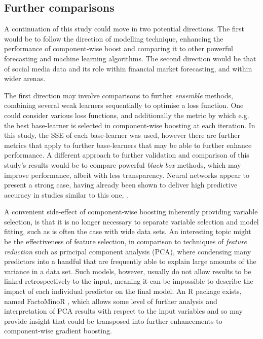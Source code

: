 \documentclass{article}
\begin{document}
\subsection{Further comparisons}
\label{sec-7-1}

A continuation of this study could move in two potential directions. The first would be to follow the direction of modelling technique, enhancing the performance of component-wise boost and comparing it to other powerful forecasting and machine learning algorithms. The second direction would be that of social media data and its role within financial market forecasting, and within wider arenas.

The first direction may involve comparisons to further \emph{ensemble} methods, combining several weak learners sequentially to optimise a loss function. One could consider various loss functions, and additionally the metric by which e.g. the best base-learner is selected in component-wise boosting at each iteration. In this study, the SSE of each base-learner was used, however there are further metrics that apply to further base-learners that may be able to further enhance performance. A different approach to further validation and comparison of this study's results would be to compare powerful \emph{black box} methods, which may improve performance, albeit with less transparency. Neural networks appear to present a strong case, having already been shown to deliver high predictive accuracy in studies similar to this one, \cite{DBLP:journals/corr/abs-1010-3003}.

A convenient side-effect of component-wise boosting inherently providing variable selection, is that it is no longer necessary to separate variable selection and model fitting, such as is often the case with wide data sets. An interesting topic might be the effectiveness of feature selection, in comparison to techniques of \emph{feature reduction} such as principal component analysis (PCA), where condensing many predictors into a handful that are frequently able to explain large amounts of the variance in a data set. Such models, however, usually do not allow results to be linked retrospectively to the input, meaning it can be impossible to describe the impact of each individual predictor on the final model. An R package exists, named FactoMinoR \cite{le2008factominer}, which allows some level of further analysis and interpretation of PCA results with respect to the input variables and so may provide insight that could be transposed into further enhancements to component-wise gradient boosting.
\end{document}
